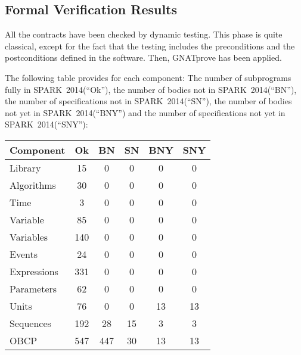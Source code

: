 \documentclass[10pt,a4paper,twocolumn]{article}
\newcommand{\gnatprove}{GNATprove\xspace}
\newcommand{\newspark}{SPARK~2014\xspace}
\begin{document}

\subsection{Formal Verification Results}

All the contracts have been checked by dynamic testing. This phase is quite classical, except for the fact that the testing includes the preconditions and the postconditions defined in the software. Then, \gnatprove has been applied.

The following table provides for each component:
The number of subprograms fully in \newspark (``Ok''),
the number of bodies not in \newspark (``BN''),
the number of specifications not in \newspark (``SN''),
the number of bodies not yet in \newspark (``BNY'') and
the number of specifications not yet in \newspark (``SNY''):

\vspace{5mm}

\begin{tabular}{|l|c|c|c|c|c|}
\hline
Component   & Ok  & BN  & SN & BNY & SNY \\
\hline
Library     &  15 &   0 &  0 &   0 &   0 \\
\hline
Algorithms  &  30 &   0 &  0 &   0 &   0 \\
\hline
Time        &   3 &   0 &  0 &   0 &   0 \\
\hline
Variable    &  85 &   0 &  0 &   0 &   0 \\
\hline
Variables   & 140 &   0 &  0 &   0 &   0 \\
\hline
Events      &  24 &   0 &  0 &   0 &   0 \\
\hline
Expressions & 331 &   0 &  0 &   0 &   0 \\
\hline
Parameters  &  62 &   0 &  0 &   0 &   0 \\
\hline
Units       &  76 &   0 &  0 &  13 &  13 \\
\hline
Sequences   & 192 &  28 & 15 &   3 &   3 \\
\hline
OBCP        & 547 & 447 & 30 &  13 &  13 \\
\hline
\end{tabular}
\end{document}
